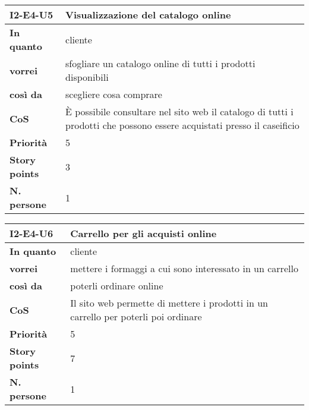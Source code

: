 \begin{table}[H]
  \begin{tabularx}{\textwidth}{lX}
    \toprule
    \textbf{I2-E4-U5} & \textbf{Visualizzazione del catalogo online} \\
    \midrule
    \textbf{In quanto} & cliente \\
    \textbf{vorrei} & sfogliare un catalogo online di tutti i prodotti disponibili \\
    \textbf{così da} & scegliere cosa comprare \\
    \midrule
    \textbf{CoS} & È possibile consultare nel sito web il catalogo di tutti i prodotti che possono essere acquistati presso il caseificio \\
    \midrule
    \textbf{Priorità} & 5 \\
    \textbf{Story points} & 3 \\
    \textbf{N. persone} & 1 \\
    \bottomrule
  \end{tabularx}
  \label{user-story:i2-e4-u5}
\end{table}

\begin{table}[H]
  \begin{tabularx}{\textwidth}{lX}
    \toprule
    \textbf{I2-E4-U6} & \textbf{Carrello per gli acquisti online} \\
    \midrule
    \textbf{In quanto} & cliente \\
    \textbf{vorrei} & mettere i formaggi a cui sono interessato in un carrello \\
    \textbf{così da} & poterli ordinare online \\
    \midrule
    \textbf{CoS} & Il sito web permette di mettere i prodotti in un carrello per poterli poi ordinare \\
    \midrule
    \textbf{Priorità} & 5 \\
    \textbf{Story points} & 7 \\
    \textbf{N. persone} & 1 \\
    \bottomrule
  \end{tabularx}
  \label{user-story:i2-e4-u6}
\end{table}

